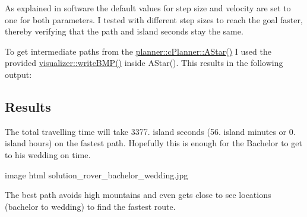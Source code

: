 As explained in software the default values for step size and velocity are set to one for both parameters. I tested with different step sizes to reach the goal faster, thereby verifying that the path and island seconds stay the same.

To get intermediate paths from the \mbox{\hyperlink{classplanner_1_1c_planner_a341e70531266f023ac9461d18979d1ef}{planner\+::c\+Planner\+::\+A\+Star()}} I used the provided \mbox{\hyperlink{namespacevisualizer_ab4e649cd7413a51ac1ae4b31a2994c3a}{visualizer\+::write\+B\+M\+P()}} inside A\+Star(). This results in the following output\+:

\subsection*{Results}

The total travelling time will take 3377. island seconds (56. island minutes or 0. island hours) on the fastest path. Hopefully this is enough for the Bachelor to get to his wedding on time.

image html solution\+\_\+rover\+\_\+bachelor\+\_\+wedding.\+jpg



The best path avoids high mountains and even gets close to see locations (bachelor to wedding) to find the fastest route.


